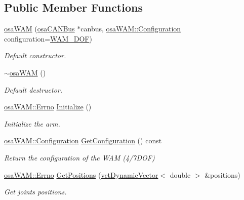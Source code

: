\subsection*{Public Member Functions}
\begin{DoxyCompactItemize}
\item 
\hyperlink{classosa_w_a_m_a5ebcc841e7184ec8dd8114076c462c37}{osa\+W\+A\+M} (\hyperlink{classosa_c_a_n_bus}{osa\+C\+A\+N\+Bus} $\ast$canbus, \hyperlink{classosa_w_a_m_ada0b00e10e6401b6b1801cd08f30748b}{osa\+W\+A\+M\+::\+Configuration} configuration=\hyperlink{classosa_w_a_m_ada0b00e10e6401b6b1801cd08f30748ba1bdf2662bd26c893783934b814db4ac3}{W\+A\+M\+\_\+D\+O\+F})
\begin{DoxyCompactList}\small\item\em Default constructor. \end{DoxyCompactList}\item 
\hyperlink{classosa_w_a_m_a11571a3eda30ca9fe1d977109e31eef1}{$\sim$osa\+W\+A\+M} ()
\begin{DoxyCompactList}\small\item\em Default destructor. \end{DoxyCompactList}\item 
\hyperlink{classosa_w_a_m_aff15893cc52d67e46cb66de794109f9e}{osa\+W\+A\+M\+::\+Errno} \hyperlink{classosa_w_a_m_a8ea60d9ba5afb2a058b09b4176675e68}{Initialize} ()
\begin{DoxyCompactList}\small\item\em Initialize the arm. \end{DoxyCompactList}\item 
\hyperlink{classosa_w_a_m_ada0b00e10e6401b6b1801cd08f30748b}{osa\+W\+A\+M\+::\+Configuration} \hyperlink{classosa_w_a_m_a3e5642537e9e8de6c3867b16f9b57faa}{Get\+Configuration} () const 
\begin{DoxyCompactList}\small\item\em Return the configuration of the W\+A\+M (4/7\+D\+O\+F) \end{DoxyCompactList}\item 
\hyperlink{classosa_w_a_m_aff15893cc52d67e46cb66de794109f9e}{osa\+W\+A\+M\+::\+Errno} \hyperlink{classosa_w_a_m_a9f9ab19fcba55b121e237368ad65d4aa}{Get\+Positions} (\hyperlink{classvct_dynamic_vector}{vct\+Dynamic\+Vector}$<$ double $>$ \&positions)
\begin{DoxyCompactList}\small\item\em Get joints positions. \end{DoxyCompactList}\item 

\end{DoxyCompactItemize}
